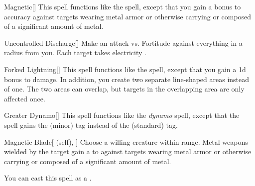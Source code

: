 \lowercase{\hypertarget{spell:Magnetic}{}}\label{spell:Magnetic}
\begin{apability}[\nth{2}]{\hypertarget{spell:Magnetic}{Magnetic}}[]
This spell functions like the  spell, except that you gain a  bonus to accuracy against targets wearing metal armor or otherwise carrying or composed of a significant amount of metal.
\end{apability}
\vspace{0.25em}



\lowercase{\hypertarget{spell:Uncontrolled Discharge}{}}\label{spell:Uncontrolled Discharge}
\begin{apability}[\nth{2}]{\hypertarget{spell:Uncontrolled Discharge}{Uncontrolled Discharge}}[]
Make an attack vs. Fortitude against everything in a \areamed radius from you.
\hit Each target takes electricity .
\end{apability}
\vspace{0.25em}



\lowercase{\hypertarget{spell:Forked Lightning}{}}\label{spell:Forked Lightning}
\begin{apability}[\nth{3}]{\hypertarget{spell:Forked Lightning}{Forked Lightning}}[]
This spell functions like the  spell, except that you gain a \plus1d bonus to damage.
In addition, you create two separate line-shaped areas instead of one.
The two areas can overlap, but targets in the overlapping area are only affected once.
\end{apability}
\vspace{0.25em}



\lowercase{\hypertarget{spell:Greater Dynamo}{}}\label{spell:Greater Dynamo}
\begin{apability}[\nth{3}]{\hypertarget{spell:Greater Dynamo}{Greater Dynamo}}[]
This spell functions like the \textit{dynamo} spell, except that the spell gains the  (minor) tag instead of the  (standard) tag.
\end{apability}
\vspace{0.25em}



\lowercase{\hypertarget{spell:Magnetic Blade}{}}\label{spell:Magnetic Blade}
\begin{attuneability}[\nth{3}]{\hypertarget{spell:Magnetic Blade}{Magnetic Blade}}[ (self), ]
Choose a willing creature within \rngclose range.
Metal weapons wielded by the target gain a   to  against targets wearing metal armor or otherwise carrying or composed of a significant amount of metal.

You can cast this spell as a .
\end{attuneability}
\vspace{0.25em}




